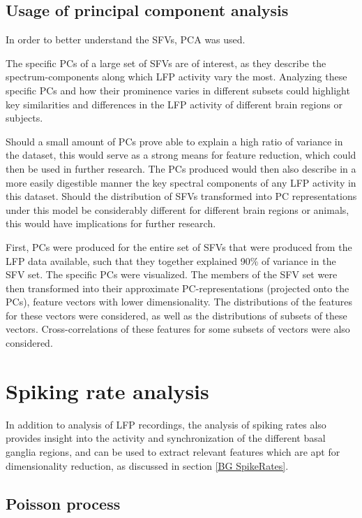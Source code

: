 \documentclass{kththesis}
\begin{document}
\subsection{Usage of principal component analysis}\label{PCA Methods}

In order to better understand the SFVs, PCA was used.

The specific PCs of a large set of SFVs are of interest, as they describe the spectrum-components along which LFP activity vary the most.
Analyzing these specific PCs and how their prominence varies in different subsets could highlight key similarities and differences in the LFP activity of different brain regions or subjects.

Should a small amount of PCs prove able to explain a high ratio of variance in the dataset, this would serve as a strong means for feature reduction, which could then be used in further research.
The PCs produced would then also describe in a more easily digestible manner the key spectral components of any LFP activity in this dataset.
Should the distribution of SFVs transformed into PC representations under this model be considerably different for different brain regions or animals, this would have implications for further research.

First, PCs were produced for the entire set of SFVs that were produced from the LFP data available, such that they together explained 90\% of variance in the SFV set.
The specific PCs were visualized.
The members of the SFV set were then transformed into their approximate PC-representations (projected onto the PCs), feature vectors with lower dimensionality.
The distributions of the features for these vectors were considered, as well as the distributions of subsets of these vectors.
Cross-correlations of these features for some subsets of vectors were also considered.

\section{Spiking rate analysis}

In addition to analysis of LFP recordings, the analysis of spiking rates also provides insight into the activity and synchronization of the different basal ganglia regions, and can be used to extract relevant features which are apt for dimensionality reduction, as discussed in section \ref{BG SpikeRates}.

\subsection{Poisson process}\label{Poiss Method}
\end{document}
